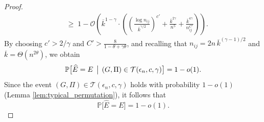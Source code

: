 \documentclass[journal]{IEEEtran}
\theoremstyle{definition}
\theoremstyle{definition}
\newcommand{\Tc}{\mathcal{T}}
\newcommand{\PP}{\mathbb{P}}
\newcommand{\kb}{\overline{k}}
\newcommand{\bigO}{\mathcal{O}}
\begin{document}
\begin{proof}
\begin{align*}
    &\;\ge\; 1 - \bigO\left( \kb^{1-\gamma} \cdot \left( 
       \left(\frac{\log n_{ij}}{\kb^{\gamma/2}}\right)^{c'} 
       + \frac{\kb^{2\gamma}}{n^5} 
       + \frac{\kb^{4\gamma}}{n_{ij}^{C'}} \right) \right).
\end{align*}
By choosing $c' > 2/\gamma$ and $C' > \tfrac{8}{1 - \theta+ \gamma\theta}$, and recalling that $n_{ij} = 2n\,\kb^{(\gamma-1)/2}$ and $\kb = \Theta(n^{2\theta})$, we obtain
\[
\PP \big[\widehat{E} = E \,\bigm|\,(G,\Pi) \in \Tc(\epsilon_n,c,\gamma)\big] = 1 - o(1).
\] 
Since the event $(G,\Pi) \in \Tc(\epsilon_n,c,\gamma)$ holds with probability $1-o(1)$ (Lemma \ref{lem:typical_permutation}), it follows that 
\[
\PP \big[\widehat{E} = E\big] = 1 - o(1).
\]
 



\end{proof}
\end{document}
